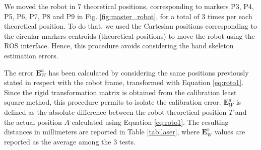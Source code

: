\documentclass[a4paper, 10 pt, conference]{ieeeconf}      %
\begin{document}
We moved the robot in $7$ theoretical positions, corresponding to markers P3, P4, P5, P6, P7, P8 and P9 in Fig. \ref{fig:master_robot}, for a total of $3$ times per each theoretical position. To do that, we used the Cartesian positions corresponding to the circular markers centroids (theoretical positions) to move the robot using the ROS interface. Hence, this procedure avoids considering the hand skeleton estimation errors.

The error $\mathbf{E}^a_{W}$ has been calculated by considering the same positions previously stated in respect with the robot frame, transformed with Equation \ref{eq:roto1}. Since the rigid transformation matrix is obtained from the calibration least square method, this procedure permits to isolate the calibration error. $\mathbf{E}^a_{W}$ is defined as the absolute difference between the robot theoretical position $T$ and the actual position $A$ calculated using Equation \ref{eq:roto1}.
The resulting distances in millimeters are reported in Table \ref{tab:laser}, where $\mathbf{E}^b_{W}$ values are reported as the average among the 3 tests.
\end{document}
